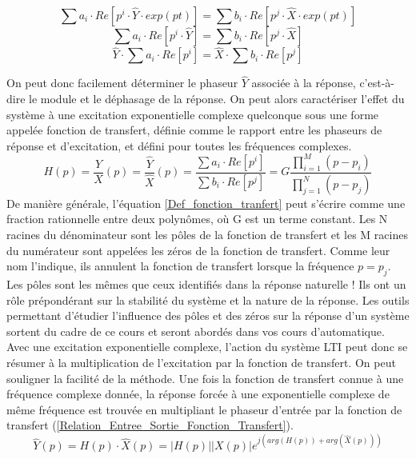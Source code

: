 \documentclass[]{report}
\begin{document}
	\begin{equation*}\label{}
	\sum a_{i} \cdot Re[p^{i} \cdot \hat{Y} \cdot exp(pt)] = \sum b_{i} \cdot Re[p^{j} \cdot \hat{X} \cdot exp(pt)]
	\end{equation*}
	\begin{equation*}\label{}
	\sum a_{i} \cdot Re[p^{i} \cdot \hat{Y}] = \sum b_{i} \cdot Re[p^{j} \cdot \hat{X}]
	\end{equation*}
	\begin{equation*}\label{}
	\hat{Y} \cdot \sum a_{i} \cdot Re[p^{i}] = \hat{X} \cdot \sum b_{i} \cdot Re[p^{j}]
	\end{equation*}
	
	On peut donc facilement déterminer le phaseur $\hat{Y}$ associée à la réponse, c'est-à-dire le module et le déphasage de la réponse. 
	On peut alors caractériser l'effet du système à une excitation exponentielle complexe quelconque sous une forme appelée fonction de transfert, définie comme le rapport entre les phaseurs de réponse et d'excitation, et défini pour toutes les fréquences complexes. 
	\begin{equation}\label{Def_fonction_tranfert}
	H(p) = \frac{Y}{X} (p) = \frac{\hat Y}{\hat X} (p)= \frac{\sum a_{i} \cdot Re[p^{i}]}{\sum b_{i} \cdot Re[p^{j}]}=G\frac{\prod_{i=1}^{M} (p-p_{i})}{\prod_{j=1}^{N} (p-p_{j})}
	\end{equation}
	De manière générale, l'équation \ref{Def_fonction_tranfert} peut s'écrire comme une fraction rationnelle entre deux polynômes, où G est un terme constant. Les N racines du dénominateur sont les pôles de la fonction de transfert et les M racines du numérateur sont appelées les zéros de la fonction de transfert. Comme leur nom l'indique, ils annulent la fonction de transfert lorsque la fréquence $p=p_{j}$. Les pôles sont les mêmes que ceux identifiés dans la réponse naturelle ! Ils ont un rôle prépondérant sur la stabilité du système et la nature de la réponse. Les outils permettant d'étudier l'influence des pôles et des zéros sur la réponse d'un système sortent du cadre de ce cours et seront abordés dans vos cours d'automatique.\\
	
	Avec une excitation exponentielle complexe, l'action du système LTI peut donc se résumer à la multiplication de l'excitation par la fonction de transfert.
	On peut souligner la facilité de la méthode. Une fois la fonction de transfert connue à une fréquence complexe donnée, la réponse forcée à une exponentielle complexe de même fréquence est trouvée en multipliant le phaseur d'entrée par la fonction de transfert (\ref{Relation_Entree_Sortie_Fonction_Transfert}).
	\begin{equation}\label{Relation_Entree_Sortie_Fonction_Transfert}
	\hat{Y}(p) = H(p)\cdot \hat{X}(p)=|H(p)||X(p)|e^{j(arg(H(p))+arg(\hat{X}(p)))}	
	\end{equation}
	
\end{document}
